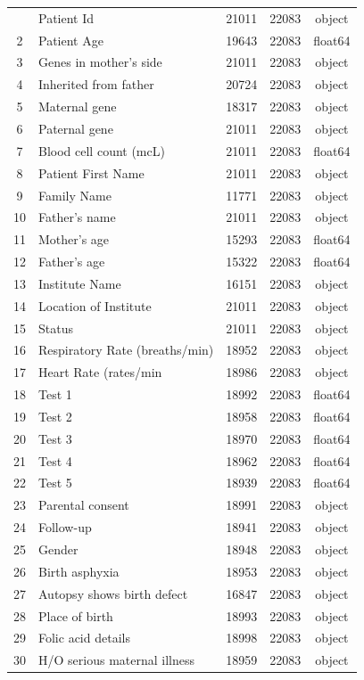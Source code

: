 \documentclass[11pt,a4paper,spanish]{book}
\numberwithin{equation}{chapter}
\numberwithin{figure}{chapter}
\begin{document}
\begin{longtable}{|c|l|c|c|c|}
\hline
\endlastfoot
\hline
1 & Patient Id & 21011 & 22083 & object \\
2 & Patient Age & 19643 & 22083 & float64 \\
3 & Genes in mother's side & 21011 & 22083 & object \\
4 & Inherited from father & 20724 & 22083 & object \\
5 & Maternal gene & 18317 & 22083 & object \\
6 & Paternal gene & 21011 & 22083 & object \\
7 & Blood cell count (mcL) & 21011 & 22083 & float64 \\
8 & Patient First Name & 21011 & 22083 & object \\
9 & Family Name & 11771 & 22083 & object \\
10 & Father's name & 21011 & 22083 & object \\
11 & Mother's age & 15293 & 22083 & float64 \\
12 & Father's age & 15322 & 22083 & float64 \\
13 & Institute Name & 16151 & 22083 & object \\
14 & Location of Institute & 21011 & 22083 & object \\
15 & Status & 21011 & 22083 & object \\
16 & Respiratory Rate (breaths/min) & 18952 & 22083 & object \\
17 & Heart Rate (rates/min & 18986 & 22083 & object \\
18 & Test 1 & 18992 & 22083 & float64 \\
19 & Test 2 & 18958 & 22083 & float64 \\
20 & Test 3 & 18970 & 22083 & float64 \\
21 & Test 4 & 18962 & 22083 & float64 \\
22 & Test 5 & 18939 & 22083 & float64 \\
23 & Parental consent & 18991 & 22083 & object \\
24 & Follow-up & 18941 & 22083 & object \\
25 & Gender & 18948 & 22083 & object \\
26 & Birth asphyxia & 18953 & 22083 & object \\
27 & Autopsy shows birth defect & 16847 & 22083 & object \\
28 & Place of birth & 18993 & 22083 & object \\
29 & Folic acid details & 18998 & 22083 & object \\
30 & H/O serious maternal illness & 18959 & 22083 & object \\

\end{longtable}
\end{document}
